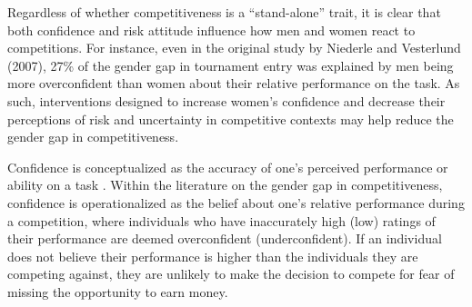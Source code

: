 \documentclass[a4paper, nobind]{templates/ociamthesis}
\begin{document}
Regardless of whether competitiveness is a ``stand-alone'' trait, it is clear that both confidence and risk attitude influence how men and women react to competitions. For instance, even in the original study by Niederle and Vesterlund (2007), 27\% of the gender gap in tournament entry was explained by men being more overconfident than women about their relative performance on the task. As such, interventions designed to increase women's confidence and decrease their perceptions of risk and uncertainty in competitive contexts may help reduce the gender gap in competitiveness.

Confidence is conceptualized as the accuracy of one's perceived performance or ability on a task \autocite{Beyer1997}. Within the literature on the gender gap in competitiveness, confidence is operationalized as the belief about one's relative performance during a competition, where individuals who have inaccurately high (low) ratings of their performance are deemed overconfident (underconfident). If an individual does not believe their performance is higher than the individuals they are competing against, they are unlikely to make the decision to compete for fear of missing the opportunity to earn money.
\end{document}
